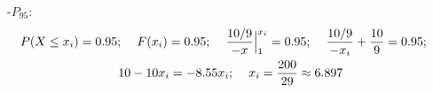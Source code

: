 -$P_{95}$:
\begin{gather*}
    P(X \leq x_i) = 0.95 ; \hspace{0.4cm} F(x_i) = 0.95 ; \hspace{0.4cm}\dfrac{10/9}{-x} \Big|^{x_i}_1 = 0.95 ; \hspace{0.4cm}\dfrac{10/9}{-x_i} + \dfrac{10}{9} = 0.95 ; \hspace{0.4cm} \\ 10-10x_i = -8.55x_i ; \hspace{0.4cm}x_i = \dfrac{200}{29} \approx 6.897
\end{gather*}
